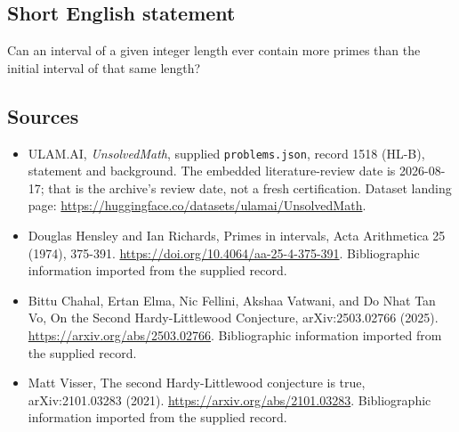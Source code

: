 \documentclass[11pt,a4paper]{article}
\begin{document}
\subsection{Short English statement}

Can an interval of a given integer length ever contain more primes than the initial interval of that same length?

\subsection{Sources}

{\small

\begin{itemize}

\item[\hypertarget{source:1518:1}{S1}] ULAM.AI, \emph{UnsolvedMath}, supplied \texttt{problems.json}, record 1518 (HL-B), statement and background. The embedded literature-review date is 2026-08-17; that is the archive’s review date, not a fresh certification. Dataset landing page: \url{https://huggingface.co/datasets/ulamai/UnsolvedMath}.

\item[\hypertarget{source:1518:2}{S2}] Douglas Hensley and Ian Richards, Primes in intervals, Acta Arithmetica 25 (1974), 375-391. \url{https://doi.org/10.4064/aa-25-4-375-391}. Bibliographic information imported from the supplied record.

\item[\hypertarget{source:1518:3}{S3}] Bittu Chahal, Ertan Elma, Nic Fellini, Akshaa Vatwani, and Do Nhat Tan Vo, On the Second Hardy-Littlewood Conjecture, arXiv:2503.02766 (2025). \url{https://arxiv.org/abs/2503.02766}. Bibliographic information imported from the supplied record.

\item[\hypertarget{source:1518:4}{S4}] Matt Visser, The second Hardy-Littlewood conjecture is true, arXiv:2101.03283 (2021). \url{https://arxiv.org/abs/2101.03283}. Bibliographic information imported from the supplied record.

\end{itemize}

}

\label{end:1518}
\end{document}
